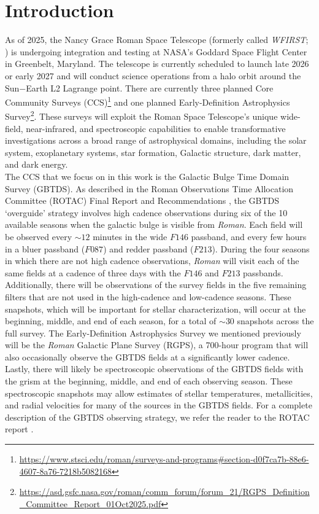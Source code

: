 \documentclass[twocolumn]{aastex631}
\begin{document}
\section{Introduction} \label{sec:intro}
As of 2025, the Nancy Grace Roman Space Telescope (formerly called \textit{WFIRST}; \cite{spergel:2015a}) is undergoing integration and testing at NASA's Goddard Space Flight Center in Greenbelt, Maryland. The telescope is currently scheduled to launch late 2026 or early 2027 and will conduct science operations from a halo orbit around the Sun$-$Earth L2 Lagrange point. There are currently three planned Core Community Surveys (CCS)\footnote{\url{https://www.stsci.edu/roman/surveys-and-programs\#section-d0f7ca7b-88e6-4607-8a76-7218b5082168}} and one planned Early-Definition Astrophysics Survey\footnote{\url{https://asd.gsfc.nasa.gov/roman/comm_forum/forum_21/RGPS_Definition_Committee_Report_01Oct2025.pdf}}. These surveys will exploit the Roman Space Telescope’s unique wide-field, near-infrared, and spectroscopic capabilities to enable transformative investigations across a broad range of astrophysical domains, including the solar system, exoplanetary systems, star formation, Galactic structure, dark matter, and dark energy.\\
\indent The CCS that we focus on in this work is the Galactic Bulge Time Domain Survey (GBTDS). As described in the Roman Observations Time Allocation Committee (ROTAC) Final Report and Recommendations \citep{rotac:2025a}, the GBTDS `overguide' strategy involves high cadence observations during six of the 10 available seasons when the galactic bulge is visible from \textit{Roman}. Each field will be observed every ${\sim}12$ minutes in the wide $F146$ passband, and every few hours in a bluer passband ($F087$) and redder passband ($F213$). During the four seasons in which there are not high cadence observations, \textit{Roman} will visit each of the same fields at a cadence of three days with the $F146$ and $F213$ passbands. Additionally, there will be observations of the survey fields in the five remaining filters that are not used in the high-cadence and low-cadence seasons. These snapshots, which will be important for stellar characterization, will occur at the beginning, middle, and end of each season, for a total of ${\sim}30$ snapshots across the full survey. The Early-Definition Astrophysics Survey we mentioned previously will be the \textit{Roman} Galactic Plane Survey (RGPS), a 700-hour program that will also occasionally observe the GBTDS fields at a significantly lower cadence. Lastly, there will likely be spectroscopic observations of the GBTDS fields with the grism at the beginning, middle, and end of each observing season. These spectroscopic snapshots may allow estimates of stellar temperatures, metallicities, and radial velocities for many of the sources in the GBTDS fields. For a complete description of the GBTDS observing strategy, we refer the reader to the ROTAC report \citep{rotac:2025a}. 
\end{document}
